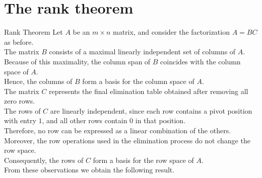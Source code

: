 \section{The rank theorem}
\begin{frame}{Rank Theorem}
\justifying
Let $A$ be an $m \times n$ matrix, and consider the factorization $A = BC$ as before.\\[0.4em]
The matrix $B$ consists of a maximal linearly independent set of columns of $A$.\\[0.3em]
Because of this maximality, the column span of $B$ coincides with the column space of $A$.\\[0.3em]
Hence, the columns of $B$ form a basis for the column space of $A$.
\pause\\[0.8em]
The matrix $C$ represents the final elimination table obtained after removing all zero rows.\\[0.3em]
The rows of $C$ are linearly independent, since each row contains a pivot position with entry $1$, and all other rows contain $0$ in that position.\\[0.3em]
Therefore, no row can be expressed as a linear combination of the others.\\[0.3em]
Moreover, the row operations used in the elimination process do not change the row space.\\[0.3em]
Consequently, the rows of $C$ form a basis for the row space of $A$.
\\[1em]
From these observations we obtain the following result.
\end{frame}
